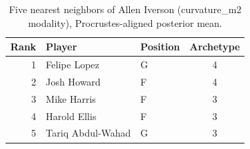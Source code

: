 \begin{table}[htbp]
  \centering\small
  \begin{tabular}{rllc}
    \toprule
    Rank & Player & Position & Archetype \\
    \midrule
    1 & Felipe Lopez & G & 4 \\
    2 & Josh Howard & F & 4 \\
    3 & Mike Harris & F & 3 \\
    4 & Harold Ellis & F & 3 \\
    5 & Tariq Abdul-Wahad & G & 3 \\
    \bottomrule
  \end{tabular}
  \caption{Five nearest neighbors of Allen Iverson (curvature_m2 modality), Procrustes-aligned posterior mean.}
  \label{tab:Allen_Iverson_neighbors_curvature_m2}
\end{table}

